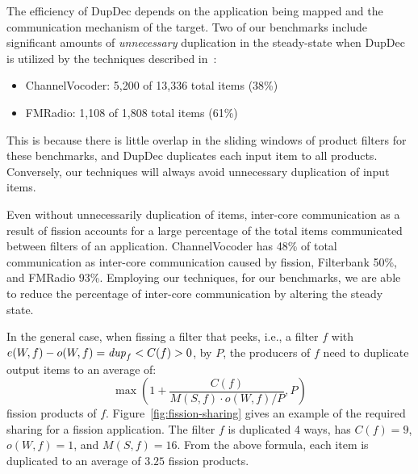 The efficiency of DupDec depends on the application being mapped and
the communication mechanism of the target.  Two of our benchmarks
include significant amounts of {\it unnecessary} duplication in the
steady-state when DupDec is utilized by the techniques described
in~\cite{gordon-asplos06}:

\begin{itemize}
\item ChannelVocoder: 5,200 of 13,336 total items (38\%)
\item FMRadio: 1,108 of 1,808 total items (61\%) 
\end{itemize}

This is because there is little overlap in the sliding windows of
product filters for these benchmarks, and DupDec duplicates each input
item to all products. Conversely, our techniques will always avoid
unnecessary duplication of input items.

Even without unnecessarily duplication of items, inter-core
communication as a result of fission accounts for a large percentage
of the total items communicated between filters of an application.
ChannelVocoder has 48\% of total communication as inter-core
communication caused by fission, Filterbank 50\%, and FMRadio 93\%.
Employing our techniques, for our benchmarks, we are able to reduce
the percentage of inter-core communication by altering the steady
state.

In the general case, when fissing a filter that peeks, i.e., a filter
$f$ with $e(W, f) - o(W, f) = \relax{\it dup}_f < C(f) > 0$, by $P$, the producers
of $f$ need to duplicate output items to an average of:
{
\ninepoint
\[ \max \left ( 1 + \frac{C(f)}{M(S, f) \cdot o(W, f) / P}, P \right )\]
}
\noindent fission products of $f$.  Figure~\ref{fig:fission-sharing}
gives an example of the required sharing for a fission application.
The filter $f$ is duplicated 4 ways, has $C(f) = 9$, $o(W, f) = 1$,
and $M(S, f) = 16$.  From the above formula, each item is duplicated
to an average of $3.25$ fission products.

